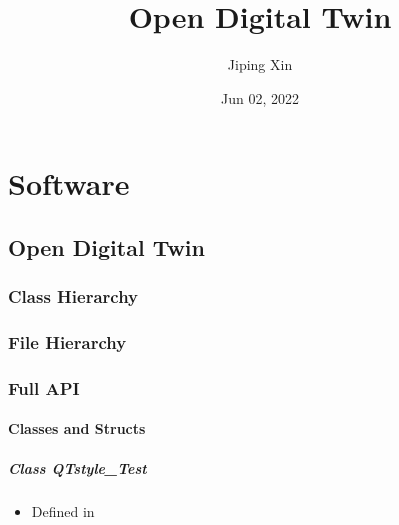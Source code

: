 \documentclass[letterpaper,10pt,english]{sphinxmanual}
\title{Open Digital Twin}
\date{Jun 02, 2022}
\author{Jiping Xin}
\begin{document}
\pagestyle{empty}
\sphinxmaketitle
\pagestyle{plain}
\sphinxtableofcontents
\pagestyle{normal}
\label{\detokenize{index::doc}}



\chapter{Software}
\label{\detokenize{index:software}}
\sphinxstepscope


\section{Open Digital Twin}
\label{\detokenize{api/library_root:open-digital-twin}}\label{\detokenize{api/library_root::doc}}

\subsection{Class Hierarchy}
\label{\detokenize{api/library_root:class-hierarchy}}



\subsection{File Hierarchy}
\label{\detokenize{api/library_root:file-hierarchy}}



\subsection{Full API}
\label{\detokenize{api/library_root:full-api}}

\subsubsection{Classes and Structs}
\label{\detokenize{api/library_root:classes-and-structs}}
\sphinxstepscope


\paragraph{Class QTstyle\_Test}
\label{\detokenize{api/classQTstyle__Test:class-qtstyle-test}}\label{\detokenize{api/classQTstyle__Test:exhale-class-classqtstyle-test}}\label{\detokenize{api/classQTstyle__Test::doc}}\begin{itemize}
\item {} 
\sphinxAtStartPar
Defined in 

\end{itemize}
\end{document}
